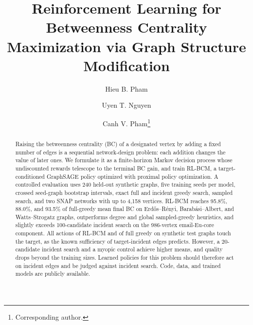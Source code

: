 \documentclass[runningheads]{llncs}
\newcommand{\rlbcm}{RL-BCM}
\begin{document}
\title{Reinforcement Learning for Betweenness Centrality Maximization via
Graph Structure Modification}

\author{Hieu B. Pham
    \and
    Uyen T. Nguyen
    \and
    Canh V. Pham\thanks{Corresponding author.}
}



\maketitle

\begin{abstract}
Raising the betweenness centrality (BC) of a designated vertex by adding a
fixed number of edges is a sequential network-design problem: each addition
changes the value of later ones. We formulate it as a finite-horizon Markov
decision process whose undiscounted rewards telescope to the terminal BC
gain, and train \rlbcm, a target-conditioned GraphSAGE policy optimized with
proximal policy optimization. A controlled evaluation uses 240 held-out
synthetic graphs, five training seeds per model, crossed seed-graph
bootstrap intervals, exact full and incident greedy search, sampled search,
and two SNAP networks with up to 4,158 vertices. \rlbcm{} reaches 95.8\%,
88.0\%, and 93.5\% of full-greedy mean final BC on Erd\H{o}s--R\'enyi,
Barab\'asi--Albert, and Watts--Strogatz graphs, outperforms degree and
global sampled-greedy heuristics, and slightly exceeds 100-candidate
incident search on the 986-vertex email-Eu-core component. All actions of
\rlbcm{} and of full greedy on synthetic test graphs touch the target, as
the known sufficiency of target-incident edges predicts. However, a
20-candidate incident search and a myopic control achieve higher means,
and quality drops beyond the training sizes. Learned policies for this
problem should therefore act on incident edges and be judged against
incident search. Code, data, and trained
models are publicly available.
\end{abstract}
\end{document}
